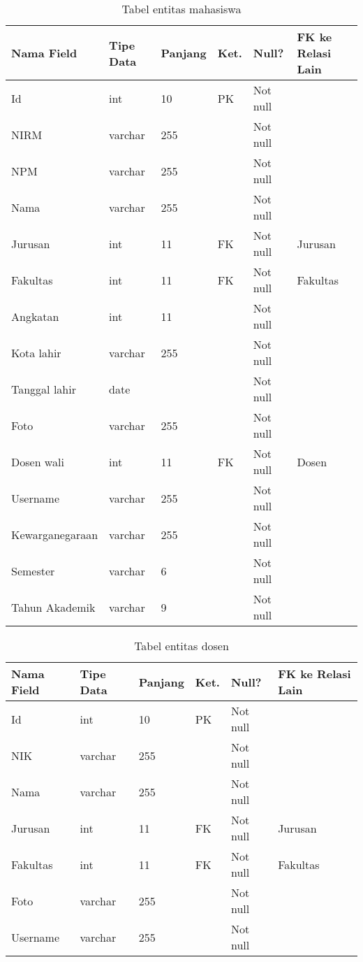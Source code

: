 \begin{table}[H]
\centering
\caption{Tabel entitas mahasiswa}
\label{entitas_mahasiswa}
\begin{tabular}{|l|l|l|l|l|l|}
\hline
\textbf{Nama Field}&\textbf{Tipe Data}&\textbf{Panjang}&\textbf{Ket.}&\textbf{Null?}&\textbf{FK ke Relasi Lain}\\ \hline
Id&int&10&PK&Not null&\\ \hline
NIRM&varchar&255&&Not null&\\ \hline
NPM&varchar&255&&Not null&\\ \hline
Nama&varchar&255&&Not null&\\ \hline
Jurusan&int&11&FK&Not null&Jurusan\\ \hline
Fakultas&int&11&FK&Not null&Fakultas\\ \hline
Angkatan&int&11&&Not null&\\ \hline
Kota lahir&varchar&255&&Not null&\\ \hline
Tanggal lahir&date&&&Not null&\\ \hline
Foto&varchar&255&&Not null&\\ \hline
Dosen wali&int&11&FK&Not null&Dosen\\ \hline
Username&varchar&255&&Not null&\\ \hline
Kewarganegaraan&varchar&255&&Not null&\\ \hline
Semester&varchar&6&&Not null&\\ \hline
Tahun Akademik&varchar&9&&Not null&\\ \hline
\end{tabular}
\end{table}

\begin{table}[H]
\centering
\caption{Tabel entitas dosen}
\label{entitas_dosen}
\begin{tabular}{|l|l|l|l|l|l|}
\hline
\textbf{Nama Field}&\textbf{Tipe Data}&\textbf{Panjang}&\textbf{Ket.}&\textbf{Null?}&\textbf{FK ke Relasi Lain}\\ \hline
Id&int&10&PK&Not null&\\ \hline
NIK&varchar&255&&Not null&\\ \hline
Nama&varchar&255&&Not null&\\ \hline
Jurusan&int&11&FK&Not null&Jurusan\\ \hline
Fakultas&int&11&FK&Not null&Fakultas\\ \hline
Foto&varchar&255&&Not null&\\ \hline
Username&varchar&255&&Not null&\\ \hline
\end{tabular}
\end{table}

